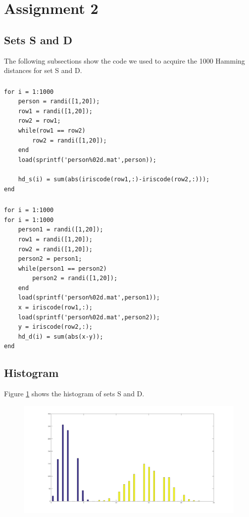 \documentclass{article}
\begin{document}
\section{Assignment 2}
\setcounter{subsection}{2}
\subsection{Sets S and D}
The following subsections show the code we used to acquire the 1000 Hamming distances for set S and D.
\subsubsection{}
\begin{lstlisting}[title = Code for set S]
for i = 1:1000
    person = randi([1,20]);
    row1 = randi([1,20]);
    row2 = row1;
    while(row1 == row2)
        row2 = randi([1,20]);
    end
    load(sprintf('person%02d.mat',person));
    
    hd_s(i) = sum(abs(iriscode(row1,:)-iriscode(row2,:)));
end
\end{lstlisting}
\subsubsection{}
\begin{lstlisting}[title = Code for set D]
for i = 1:1000
for i = 1:1000
    person1 = randi([1,20]);
    row1 = randi([1,20]);
    row2 = randi([1,20]);
    person2 = person1;
    while(person1 == person2)
        person2 = randi([1,20]);
    end
    load(sprintf('person%02d.mat',person1));
    x = iriscode(row1,:);
    load(sprintf('person%02d.mat',person2));
    y = iriscode(row2,:);
    hd_d(i) = sum(abs(x-y));
end
\end{lstlisting}
\subsection{Histogram}
Figure \ref{fig2.4} shows the histogram of sets S and D.
\begin{figure}[H]
\centering
\includegraphics[width=\linewidth]{plot2_4.png}
\label{fig2.4}
\end{figure}

\subsection{}
\subsection{}
\subsection{}
\subsection{}
\end{document}
